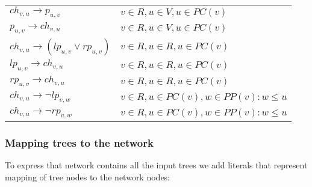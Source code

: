 \documentclass[runningheads, envcountsame, a4paper]{llncs}
\begin{document}
\begin{table}
{\begin{tabular}{l | l}
  \hline 
  $ch_{v,u} \rightarrow p_{u,v}$ &
  $v \in R, u \in V, u \in PC(v)$
  \\
  $p_{u,v} \rightarrow ch_{v,u}$ &
  $v \in R, u \in V, u \in PC(v)$
  \\
  
  \hline
  $ch_{v,u} \rightarrow (lp_{u,v} \vee rp_{u,v})$ &
  $v \in R, u \in R, u \in PC(v)$
  \\
  $lp_{u,v} \rightarrow ch_{v,u}$ &
  $v \in R, u \in R, u \in PC(v)$
  \\
  $rp_{u,v} \rightarrow ch_{v,u}$ &
  $v \in R, u \in R, u \in PC(v)$
  \\
  
  \hline
  $ch_{v,u} \rightarrow \neg lp_{v,w}$ &
  $v \in R, u \in PC(v), w \in PP(v): w \leq u$
  \\
  $ch_{v,u} \rightarrow \neg rp_{v,w}$ &
  $v \in R, u \in PC(v), w \in PP(v): w \leq u$
  \\
  
\end{tabular}
}
\label{network-table}
\end{table}

\subsubsection{Mapping trees to the network}

To express that network contains all the input trees we add literals that represent mapping of tree nodes to 
the network nodes:
\end{document}
